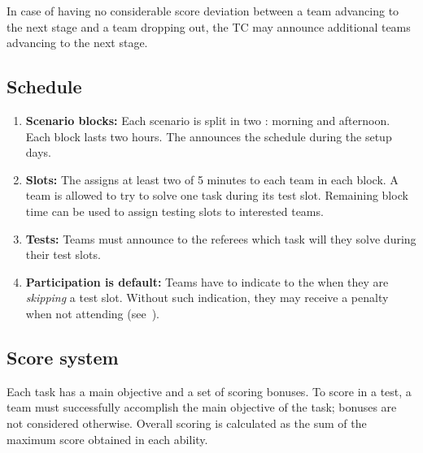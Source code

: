 In case of having no considerable score deviation between a team advancing to the next stage and a team dropping out, the TC may announce additional teams advancing to the next stage.


\subsection{Schedule}
\label{rule:schedule}

\begin{enumerate}
	\item \textbf{Scenario blocks:} Each scenario is split in two : morning and afternoon.
	Each block lasts two hours.
	The  announces the schedule during the setup days.

	\item \textbf{Slots:} The  assigns at least two  of 5 minutes to each team in each block.
	A team is allowed to try to solve one task during its test slot.
	Remaining block time can be used to assign testing slots to interested teams.

	\item \textbf{Tests:} Teams must announce to the referees which task will they solve during their test slots.

	\item \textbf{Participation is default:} Teams have to indicate to the  when they are \emph{skipping} a test slot. Without such indication, they may receive a penalty when not attending (see~).
\end{enumerate}


\subsection{Score system}
\label{rule:score_system}
Each task has a main objective and a set of scoring bonuses.
To score in a test, a team must successfully accomplish the main objective of the task; bonuses are not considered otherwise.
Overall scoring is calculated as the sum of the maximum score obtained in each ability.

